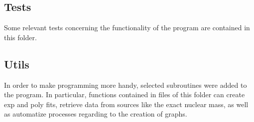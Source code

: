 \documentclass[openany]{book}
\begin{document}
\subsection{Tests} \label{sub:codesTests}

Some relevant tests concerning the functionality of the program are contained in this folder.

\subsection{Utils} \label{sub:codesUtils}

In order to make programming more handy, selected subroutines were added to the program. In particular, functions contained in files of this folder can create exp and poly fits, retrieve data from sources like the exact nuclear mass, as well as automatize processes regarding to the creation of graphs.

\newpage


\end{document}
